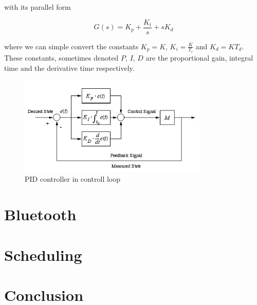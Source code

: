 \documentclass{article}
\begin{document}
\noindent with its parallel form

\begin{equation}
    G(s) = K_p + \frac{K_i}{s} + sK_d
\end{equation}

\noindent where we can simple convert the constants $K_p = K$, $K_i =
\frac{K}{T_i}$ and $K_d = KT_d$. These constants, sometimes denoted $P$, $I$, $D$ are the proportional gain,
integral time and the derivative time respectively.

\begin{figure}[h]
    \centering
    \includegraphics[width=9cm]{pid}
    \caption{PID controller in controll loop \cite{pidpic}}
    \label{fig:pidpic}
\end{figure}

\section{Bluetooth}

\section{Scheduling}

\section{Conclusion}

\printbibliography
\end{document}
